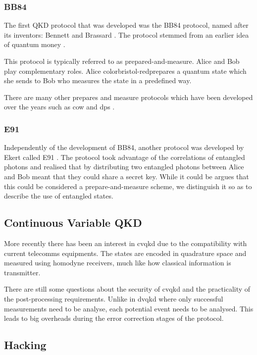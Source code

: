 \subsubsection*{BB84}

The first \ac{QKD} protocol that was developed was the BB84 protocol, named after its inventors: Bennett and Brassard \cite{BB84}. The protocol stemmed from an earlier idea of quantum money \cite{quantum_money}.

This protocol is typically referred to as {\color{bristol-red}prepared-and-measure}. Alice and Bob play complementary roles. Alice {color{bristol-red}prepares} a quantum state which she sends to Bob who {\color{bristol-red}measures} the state in a predefined way. 

There are many other prepares and measure protocols which have been developed over the years such as \ac{cow} \cite{COW-QKD} and \ac{dps} \cite{DPS-QKD}.

\subsubsection*{E91}

Independently of the development of BB84, another protocol was developed by Ekert called E91 \cite{E91}. The protocol took advantage of the correlations of entangled photons and realised that by distributing two entangled photons between Alice and Bob meant that they could share a secret key. While it could be argues that this could be considered a prepare-and-measure scheme, we distinguish it so as to describe the use of entangled states.

\subsection{Continuous Variable QKD}

More recently there has been an interest in \ac{cvqkd} due to the compatibility with current telecomms equipments. The states are encoded in quadrature space and measured using homodyne receivers, much like how classical information is transmitter.

There are still some questions about the security of \ac{cvqkd} and the practicality of the post-processing requirements. Unlike in \ac{dvqkd} where only successful measurements need to be analyse, each potential event needs to be analysed. This leads to big overheads during the error correction stages of the protocol.

\subsection{Hacking}

